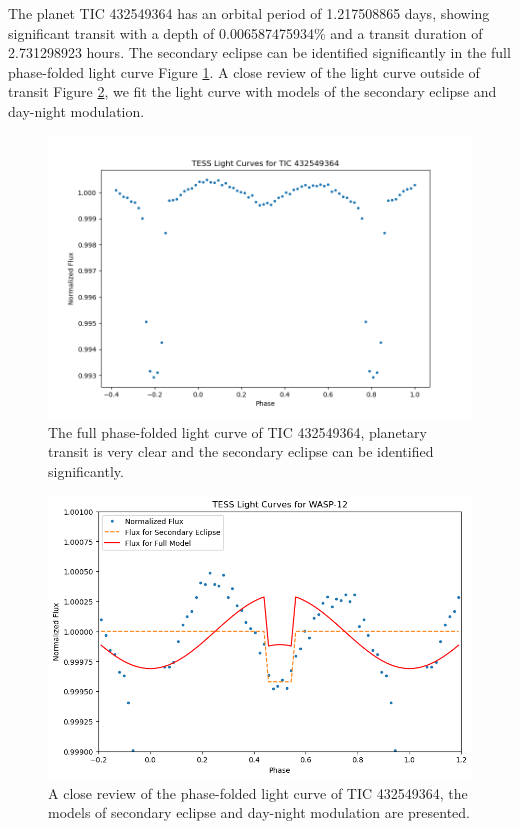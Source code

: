 \documentclass{article}
\begin{document}
The planet TIC 432549364 has an orbital period of 1.217508865 days, showing significant transit with a depth of 0.006587475934\% and a transit duration of 2.731298923 hours. The secondary eclipse can be identified significantly in the full phase-folded light curve Figure \ref{fig:432549364_folded}. A close review of the light curve outside of transit Figure \ref{fig:432549364}, we fit the light curve with models of the secondary eclipse and day-night modulation.\begin{figure}[H]\centering\includegraphics[width=0.7\linewidth]{image/432549364_folded.png}\captionsetup{font=small} \caption{The full phase-folded light curve of TIC 432549364, planetary transit is very clear and the secondary eclipse can be identified significantly.}\label{fig:432549364_folded}\end{figure}\begin{figure}[H]\centering\includegraphics[width=0.65\linewidth]{image/432549364.png}\captionsetup{font=small} \caption{A close review of the phase-folded light curve of TIC 432549364, the models of secondary eclipse and day-night modulation are presented.}\label{fig:432549364}\end{figure}
\newpage
\end{document}
